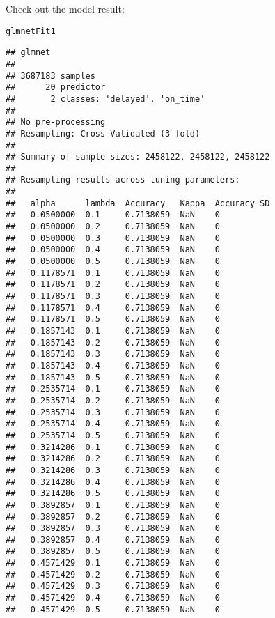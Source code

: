 \documentclass{article}\usepackage[]{graphicx}\usepackage[]{color}
\makeatletter
\newcommand{\hlstd}[1]{\textcolor[rgb]{0.345,0.345,0.345}{#1}}%
\newenvironment{kframe}{%
 \def\at@end@of@kframe{}%
 \ifinner\ifhmode%
  \def\at@end@of@kframe{\end{minipage}}%
  \begin{minipage}{\columnwidth}%
 \fi\fi%
 \def\FrameCommand##1{\hskip\@totalleftmargin \hskip-\fboxsep
 \colorbox{shadecolor}{##1}\hskip-\fboxsep
     \hskip-\linewidth \hskip-\@totalleftmargin \hskip\columnwidth}%
 \MakeFramed {\advance\hsize-\width
   \@totalleftmargin\z@ \linewidth\hsize
   \@setminipage}}%
 {\par\unskip\endMakeFramed%
 \at@end@of@kframe}
\newenvironment{knitrout}{}{} %
\makeatother
\begin{document}
Check out the model result:
\begin{knitrout}
\color{fgcolor}\begin{kframe}
\begin{alltt}
\hlstd{glmnetFit1}
\end{alltt}
\begin{verbatim}
## glmnet 
## 
## 3687183 samples
##      20 predictor
##       2 classes: 'delayed', 'on_time' 
## 
## No pre-processing
## Resampling: Cross-Validated (3 fold) 
## 
## Summary of sample sizes: 2458122, 2458122, 2458122 
## 
## Resampling results across tuning parameters:
## 
##   alpha      lambda  Accuracy   Kappa  Accuracy SD
##   0.0500000  0.1     0.7138059  NaN    0          
##   0.0500000  0.2     0.7138059  NaN    0          
##   0.0500000  0.3     0.7138059  NaN    0          
##   0.0500000  0.4     0.7138059  NaN    0          
##   0.0500000  0.5     0.7138059  NaN    0          
##   0.1178571  0.1     0.7138059  NaN    0          
##   0.1178571  0.2     0.7138059  NaN    0          
##   0.1178571  0.3     0.7138059  NaN    0          
##   0.1178571  0.4     0.7138059  NaN    0          
##   0.1178571  0.5     0.7138059  NaN    0          
##   0.1857143  0.1     0.7138059  NaN    0          
##   0.1857143  0.2     0.7138059  NaN    0          
##   0.1857143  0.3     0.7138059  NaN    0          
##   0.1857143  0.4     0.7138059  NaN    0          
##   0.1857143  0.5     0.7138059  NaN    0          
##   0.2535714  0.1     0.7138059  NaN    0          
##   0.2535714  0.2     0.7138059  NaN    0          
##   0.2535714  0.3     0.7138059  NaN    0          
##   0.2535714  0.4     0.7138059  NaN    0          
##   0.2535714  0.5     0.7138059  NaN    0          
##   0.3214286  0.1     0.7138059  NaN    0          
##   0.3214286  0.2     0.7138059  NaN    0          
##   0.3214286  0.3     0.7138059  NaN    0          
##   0.3214286  0.4     0.7138059  NaN    0          
##   0.3214286  0.5     0.7138059  NaN    0          
##   0.3892857  0.1     0.7138059  NaN    0          
##   0.3892857  0.2     0.7138059  NaN    0          
##   0.3892857  0.3     0.7138059  NaN    0          
##   0.3892857  0.4     0.7138059  NaN    0          
##   0.3892857  0.5     0.7138059  NaN    0          
##   0.4571429  0.1     0.7138059  NaN    0          
##   0.4571429  0.2     0.7138059  NaN    0          
##   0.4571429  0.3     0.7138059  NaN    0          
##   0.4571429  0.4     0.7138059  NaN    0          
##   0.4571429  0.5     0.7138059  NaN    0          

\end{verbatim}
\end{kframe}
\end{knitrout}
\end{document}
